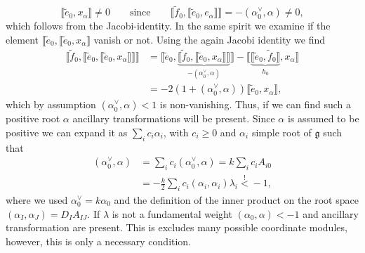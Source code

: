 \begin{equation}
    \llbracket \tilde{e}_0,x_\alpha\rrbracket \neq 0 \qquad \text{since}\qquad \llbracket \tilde{f}_0,\llbracket \tilde{e}_0,e_\alpha\rrbracket\rrbracket = -(\alpha_0^\vee,\alpha)\neq 0, 
\end{equation}
which follows from the Jacobi-identity. In the same spirit we examine if the element $\llbracket \tilde{e}_0,\llbracket \tilde{e}_0,x_\alpha\rrbracket$ vanish or not. Using the again Jacobi identity we find
\begin{equation}
    \begin{aligned}
        \llbracket \tilde{f}_0,\llbracket \tilde{e}_0,\llbracket \tilde{e}_0,x_\alpha\rrbracket\rrbracket\rrbracket  &= \llbracket \tilde{e}_0,\underbrace{\llbracket\tilde{f}_0,\llbracket \tilde{e}_0,x_\alpha\rrbracket\rrbracket}_{-(\alpha_0^\vee,\alpha)}\rrbracket-\llbracket\underbrace{\llbracket \tilde{e}_0,\tilde{f}_0\rrbracket}_{h_0},x_\alpha\rrbracket\\
        &= -2(1+(\alpha_0^\vee,\alpha))\llbracket \tilde{e}_0,x_\alpha\rrbracket,
    \end{aligned}
\end{equation}
which by assumption $(\alpha_0^\vee,\alpha)<1$ is non-vanishing. Thus, if we can find such a positive root $\alpha$ ancillary transformations will be present. Since $\alpha$ is assumed to be positive we can expand it as $\sum_i c_i\alpha_i$, with $c_i\geq 0$ and $\alpha_i$ simple root of $\mathfrak{g}$ such that
\begin{equation}
    \begin{aligned}
        (\alpha_0^\vee,\alpha) &= \sum_i c_i(\alpha_0^\vee,\alpha) = k\sum_i c_i A_{i0}\\ 
        &= -\frac{k}{2}\sum_ic_i(\alpha_i,\alpha_i)\lambda_i\overset{!}{<}-1,
    \end{aligned}
\end{equation}
where we used $\alpha_0^\vee = k\alpha_0$ and the definition of the inner product on the root space $(\alpha_I,\alpha_J)=D_IA_{IJ}$. If $\lambda$ is not a fundamental weight $(\alpha_0,\alpha)<-1$ and ancillary transformation are present. This is excludes many possible coordinate modules, however, this is only a necessary condition. 


